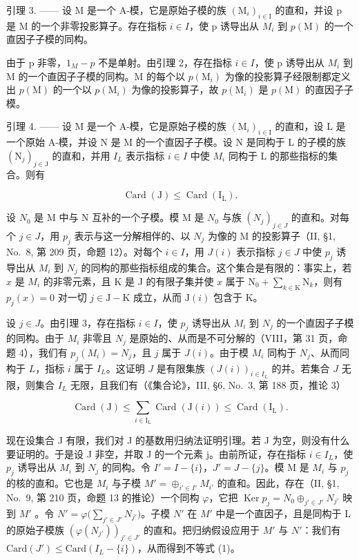 引理 3. —— 设 M 是一个 A-模，它是原始子模的族 \((\mathrm{M}_{i})_{i\in\mathrm{I}}\) 的直和，并设 p 是 M 的一个非零投影算子。存在指标 \(i\in I\)，使 p 诱导出从 \(M_{i}\) 到 \(p(\mathrm{M})\) 的一个直因子子模的同构。

由于 p 非零，\(1_{M} - p\) 不是单射。由引理 2，存在指标 \(i \in I\)，使 p 诱导出从 \(M_{i}\) 到 M 的一个直因子子模的同构。M 的每个以 \(p(\mathrm{M}_{i})\) 为像的投影算子经限制都定义出 \(p(\mathrm{M})\) 的一个以 \(p(\mathrm{M}_{i})\) 为像的投影算子，故 \(p(\mathrm{M}_{i})\) 是 \(p(\mathrm{M})\) 的直因子子模。

引理 4. —— 设 M 是一个 A-模，它是原始子模的族 \((\mathrm{M}_{i})_{i\in\mathrm{I}}\) 的直和，设 L 是一个原始 A-模，并设 N 是 M 的一个直因子子模。设 N 是同构于 L 的子模的族 \((\mathrm{N}_{j})_{j\in\mathrm{J}}\) 的直和，并用 \(I_{L}\) 表示指标 \(i\in I\) 中使 \(M_{i}\) 同构于 L 的那些指标的集合。则有

\[
\operatorname{Card} (\mathrm{J}) \leqslant \operatorname{Card} \left(\mathrm{I} _ {\mathrm{L}}\right).\tag{1}
\]

设 \(N_0\) 是 M 中与 N 互补的一个子模。模 M 是 \(N_0\) 与族 \((N_j)_{j \in J}\) 的直和。对每个 \(j \in J\)，用 \(p_j\) 表示与这一分解相伴的、以 \(N_j\) 为像的 M 的投影算子（II, §1, No.~8, 第 209 页，命题 12）。对每个 \(i \in I\)，用 \(J(i)\) 表示指标 \(j \in J\) 中使 \(p_j\) 诱导出从 \(M_i\) 到 \(N_j\) 的同构的那些指标组成的集合。这个集合是有限的：事实上，若 \(x\) 是 \(M_i\) 的非零元素，且 K 是 J 的有限子集并使 \(x\) 属于 \(\mathrm{N}_0 + \sum_{k\in \mathrm{K}}\mathrm{N}_k\)，则有 \(p_j(x) = 0\) 对一切 \(j\in \mathrm{J} - \mathrm{K}\) 成立，从而 \(\mathrm{J}(i)\) 包含于 \(\mathrm{K}\)。

设 \(j \in J\)。由引理 3，存在指标 \(i \in I\)，使 \(p_j\) 诱导出从 \(M_i\) 到 \(N_j\) 的一个直因子子模的同构。由于 \(M_i\) 非零且 \(N_j\) 是原始的、从而是不可分解的（VIII，第 31 页，命题 4），我们有 \(p_j(M_i) = N_j\)，且 \(j\) 属于 \(J(i)\)。由于模 \(M_i\) 同构于 \(N_j\)、从而同构于 \(L\)，指标 \(i\) 属于 \(I_L\)。这证明 \(J\) 是有限集族 \((J(i))_{i \in I_L}\) 的并。若集合 \(J\) 无限，则集合 \(I_L\) 无限，且我们有（《集合论》，III, §6, No.~3, 第 188 页，推论 3）

\[
\operatorname{Card} (\mathrm{J}) \leqslant \sum_ {i \in \mathrm{I} _ {\mathrm{L}}} \operatorname{Card} (\mathrm{J} (i)) \leqslant \operatorname{Card} (\mathrm{I} _ {\mathrm{L}}).
\]

现在设集合 J 有限，我们对 J 的基数用归纳法证明引理。若 J 为空，则没有什么要证明的。于是设 J 非空，并取 J 的一个元素 j。由前所证，存在指标 \(i \in I_{L}\)，使 \(p_{j}\) 诱导出从 \(M_{i}\) 到 \(N_{j}\) 的同构。令 \(I' = I - \{i\}\)，\(J' = J - \{j\}\)。模 M 是 \(M_{i}\) 与 \(p_{j}\) 的核的直和。它也是 \(M_{i}\) 与子模 \(M' = \oplus_{i' \in I'} M_{i'}\) 的直和。因此，存在（II, §1, No.~9, 第 210 页，命题 13 的推论）一个同构 \(\varphi\)，它把 \(\operatorname{Ker} p_{j} = N_{0} \oplus_{j' \in J'} N_{j'}\) 映到 \(M'\) 。令 \(N' = \varphi\big(\sum_{j' \in J'} N_{j'}\big)\)。子模 \(N'\) 在 \(M'\) 中是一个直因子，且是同构于 L 的原始子模族 \((\varphi(N_{j'}))_{j' \in J'}\) 的直和。把归纳假设应用于 \(M'\) 与 \(N'\)：我们有 \(\text{Card}(J') \leqslant \text{Card}(I_L - \{i\})\)，从而得到不等式 (1)。

